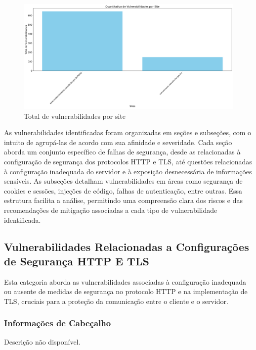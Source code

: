 \documentclass[a4paper,12pt]{article}
\begin{document}
\begin{figure}[h!]
    \centering
    \includegraphics[width=1.0\textwidth]{assets/images-was/Vulnerabilidades_x_site.png}
    \caption{Total de vulnerabilidades por site}
\end{figure}
\FloatBarrier
As vulnerabilidades identificadas foram organizadas em seções e subseções, com o intuito de agrupá-las de acordo com sua afinidade e severidade. Cada seção aborda um conjunto específico de falhas de segurança, desde as relacionadas à configuração de segurança dos protocolos HTTP e TLS, até questões relacionadas à configuração inadequada do servidor e à exposição desnecessária de informações sensíveis. As subseções detalham vulnerabilidades em áreas como segurança de cookies e sessões, injeções de código, falhas de autenticação, entre outras. Essa estrutura facilita a análise, permitindo uma compreensão clara dos riscos e das recomendações de mitigação associadas a cada tipo de vulnerabilidade identificada.

\subsection{Vulnerabilidades Relacionadas a Configurações de Segurança HTTP E TLS}
Esta categoria aborda as vulnerabilidades associadas à configuração inadequada ou ausente de medidas de segurança no protocolo HTTP e na implementação de TLS, cruciais para a proteção da comunicação entre o cliente e o servidor.

\subsubsection{Informações de Cabeçalho}
Descrição não disponível.
\end{document}
